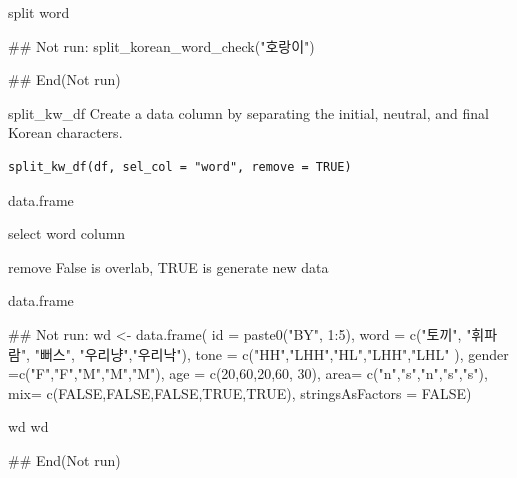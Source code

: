 \documentclass[a4paper]{book}
\begin{document}
%
\begin{Value}
split word
\end{Value}
%
\begin{Examples}
\begin{ExampleCode}
\#\# Not run: 
split_korean_word_check("호랑이")

## End(Not run)

\end{ExampleCode}
\end{Examples}
%
\begin{Description}
split\_kw\_df Create a data column by separating the initial, neutral, and final Korean characters.
\end{Description}
%
\begin{Usage}
\begin{verbatim}
split_kw_df(df, sel_col = "word", remove = TRUE)
\end{verbatim}
\end{Usage}
%
\begin{Arguments}
\begin{ldescription}
\item[\code{df}] data.frame

\item[\code{sel\_col}] select word column

\item[\code{remove}] remove False is overlab, TRUE is generate new data
\end{ldescription}
\end{Arguments}
%
\begin{Value}
data.frame
\end{Value}
%
\begin{Examples}
\begin{ExampleCode}
\#\# Not run: 
wd <- data.frame(
id =  paste0("BY", 1:5),
word = c("토끼", "휘파람", "뻐스", "우리냥","우리낙"),
tone = c("HH","LHH","HL","LHH","LHL" ),
gender =c("F","F","M","M","M"),
age = c(20,60,20,60, 30),
area= c("n","s","n","s","s"),
mix= c(FALSE,FALSE,FALSE,TRUE,TRUE),
stringsAsFactors = FALSE)

wd%
wd%


## End(Not run)

\end{ExampleCode}
\end{Examples}
\end{document}
